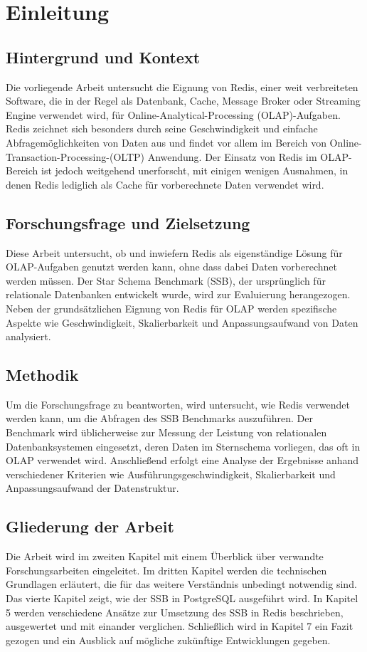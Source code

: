 \chapter{Einleitung}

\section{Hintergrund und Kontext}
Die vorliegende Arbeit untersucht die Eignung von Redis, einer weit verbreiteten Software, die in der Regel als Datenbank, Cache, Message Broker oder Streaming Engine verwendet wird, für Online-Analytical-Processing (OLAP)-Aufgaben. Redis zeichnet sich besonders durch seine Geschwindigkeit und einfache Abfragemöglichkeiten von Daten aus und findet vor allem im Bereich von Online-Transaction-Processing-(OLTP) Anwendung. Der Einsatz von Redis im OLAP-Bereich ist jedoch weitgehend unerforscht, mit einigen wenigen Ausnahmen, in denen Redis lediglich als Cache für vorberechnete Daten verwendet wird.

\section{Forschungsfrage und Zielsetzung}
Diese Arbeit untersucht, ob und inwiefern Redis als eigenständige Lösung für OLAP-Aufgaben genutzt werden kann, ohne dass dabei Daten vorberechnet werden müssen. Der Star Schema Benchmark (SSB), der ursprünglich für relationale Datenbanken entwickelt wurde, wird zur Evaluierung herangezogen. Neben der grundsätzlichen Eignung von Redis für OLAP werden spezifische Aspekte wie Geschwindigkeit, Skalierbarkeit und Anpassungsaufwand von Daten analysiert.

\section{Methodik}
Um die Forschungsfrage zu beantworten, wird untersucht, wie Redis verwendet werden kann, um die Abfragen des SSB Benchmarks auszuführen. Der Benchmark wird üblicherweise zur Messung der Leistung von relationalen Datenbanksystemen eingesetzt, deren Daten im Sternschema vorliegen, das oft in OLAP verwendet wird.
Anschließend erfolgt eine Analyse der Ergebnisse anhand verschiedener Kriterien wie Ausführungsgeschwindigkeit, Skalierbarkeit und Anpassungsaufwand der Datenstruktur.


\section{Gliederung der Arbeit}
Die Arbeit wird im zweiten Kapitel mit einem Überblick über verwandte Forschungsarbeiten eingeleitet.
Im dritten Kapitel werden die technischen Grundlagen erläutert, die für das weitere Verständnis unbedingt notwendig sind.
Das vierte Kapitel zeigt, wie der \acf{SSB} in PostgreSQL ausgeführt wird.
In Kapitel 5 werden verschiedene Ansätze zur Umsetzung des \ac{SSB} in Redis beschrieben, ausgewertet und mit einander verglichen.
Schließlich wird in Kapitel 7 ein Fazit gezogen und ein Ausblick auf mögliche zukünftige Entwicklungen gegeben.

 